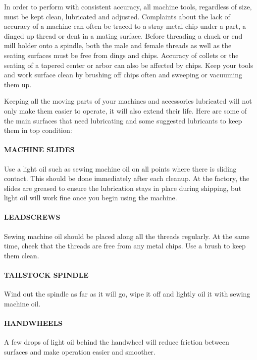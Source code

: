 \secdown


In order to perform with consistent accuracy, all machine tools, regardless of
size, must be kept clean, lubricated and adjusted. Complaints about the lack of
accuracy of a machine can often be traced to a stray metal chip under a part, a
dinged up thread or dent in a mating surface. Before threading a chuck or end
mill holder onto a spindle, both the male and female threads as well as the
seating surfaces must be free from dings and chips. Accuracy of collets or the
seating of a tapered center or arbor can also be affected by chips. Keep your
tools and work surface clean by brushing off chips often and sweeping or
vacuuming them up.


Keeping all the moving parts of your machines and accessories lubricated will
not only make them easier to operate, it will also extend their life. Here are
some of the main surfaces that need lubricating and some suggested lubricants to
keep them in top condition:

\paragraph{MACHINE SLIDES} Use a light oil such as sewing machine oil on all
points where there is sliding contact. This should be done immediately after
each cleanup. At the factory, the slides are greased to ensure the lubrication
stays in place during shipping, but light oil will work fine once you begin
using the machine.

\paragraph{LEADSCREWS} Sewing machine oil should be placed along all the threads
regularly. At the same time, cheek that the threads are free from any metal
chips. Use a brush to keep them clean.

\paragraph{TAILSTOCK SPINDLE} Wind out the spindle as far as it will go, wipe it
off and lightly oil it with sewing machine oil.

\paragraph{HANDWHEELS} A few drops of light oil behind the handwheel will reduce
friction between surfaces and make operation easier and smoother.

